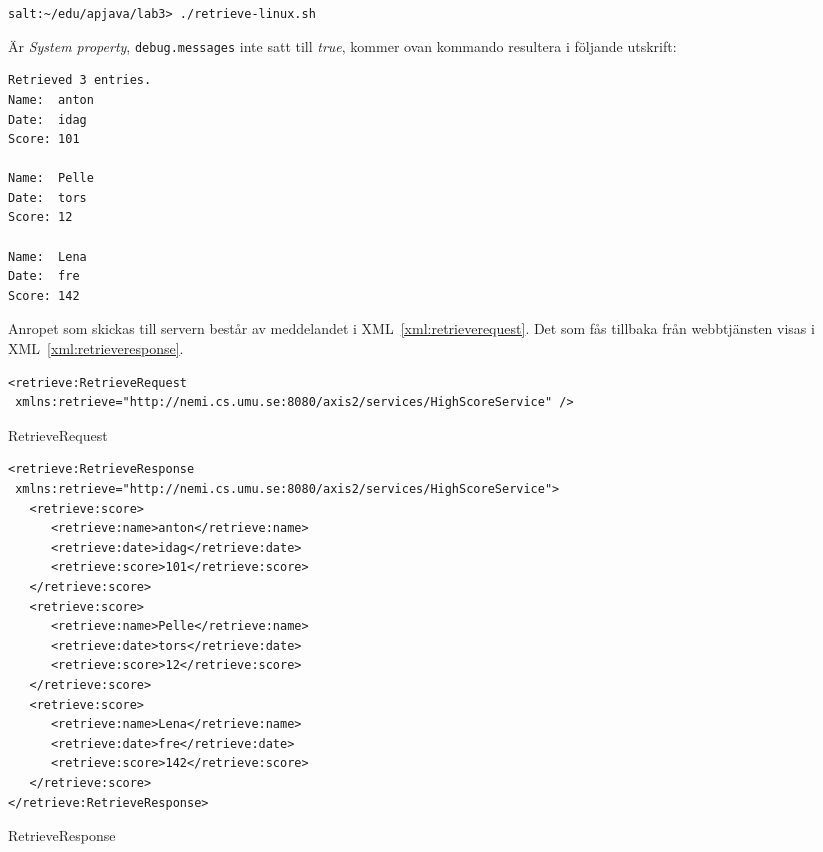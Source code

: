 \documentclass[a4paper, 12pt]{article}
\begin{document}
\begin{footnotesize}
\verb!salt:~/edu/apjava/lab3> ./retrieve-linux.sh!
\end{footnotesize}

Är \textit{System property}, \verb!debug.messages! inte satt till
\textit{true}, kommer ovan kommando resultera i följande utskrift:

\begin{footnotesize}
\begin{verbatim}
Retrieved 3 entries.
Name:  anton
Date:  idag
Score: 101

Name:  Pelle
Date:  tors
Score: 12

Name:  Lena
Date:  fre
Score: 142
\end{verbatim}
\end{footnotesize}

Anropet som skickas till servern består av meddelandet i
XML~\ref{xml:retrieverequest}. Det som fås tillbaka från webbtjänsten
visas i XML~\ref{xml:retrieveresponse}.

\begin{xml}
  \begin{footnotesize}
\begin{verbatim}
<retrieve:RetrieveRequest
 xmlns:retrieve="http://nemi.cs.umu.se:8080/axis2/services/HighScoreService" />
\end{verbatim}
  \end{footnotesize}
  \caption{RetrieveRequest}\label{xml:retrieverequest}
\end{xml}

\begin{xml}
  \begin{footnotesize}
\begin{verbatim}
<retrieve:RetrieveResponse
 xmlns:retrieve="http://nemi.cs.umu.se:8080/axis2/services/HighScoreService">
   <retrieve:score>
      <retrieve:name>anton</retrieve:name>
      <retrieve:date>idag</retrieve:date>
      <retrieve:score>101</retrieve:score>
   </retrieve:score>
   <retrieve:score>
      <retrieve:name>Pelle</retrieve:name>
      <retrieve:date>tors</retrieve:date>
      <retrieve:score>12</retrieve:score>
   </retrieve:score>
   <retrieve:score>
      <retrieve:name>Lena</retrieve:name>
      <retrieve:date>fre</retrieve:date>
      <retrieve:score>142</retrieve:score>
   </retrieve:score>
</retrieve:RetrieveResponse>
\end{verbatim}
  \end{footnotesize}
  \caption{RetrieveResponse}\label{xml:retrieveresponse}
\end{xml}
\end{document}
